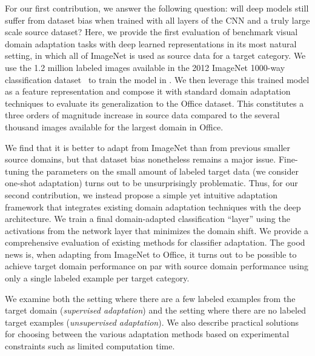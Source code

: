 For our first contribution, we answer the following question: will deep models still suffer from dataset
bias when trained with all layers of the CNN and a truly large scale source
dataset?
Here, we provide the first evaluation of benchmark visual domain adaptation
tasks with deep learned representations in its most natural setting, in which
all of ImageNet is used as source data for a target category.  We use the 1.2
million labeled images available in the 2012 ImageNet 1000-way classification
dataset~\cite{ilsvrc2012} to train the model in \cite{supervision}.  We then
leverage this trained model as a feature representation and compose it with
standard domain adaptation techniques to evaluate its generalization to the
Office dataset.  This constitutes a three orders of magnitude increase in source
data compared to the several thousand images available for the largest domain in
Office.

We find that it is better to adapt from ImageNet than from previous smaller source domains, but  that dataset bias nonetheless remains a major issue. Fine-tuning the parameters on the small amount of labeled target data (we consider one-shot adaptation) turns out to be unsurprisingly problematic. Thus, for our second contribution, we instead propose a simple yet intuitive adaptation framework that integrates existing domain adaptation techniques with the deep architecture. We train a final domain-adapted classification ``layer'' using the activations from the network layer that minimizes the domain shift. 
We provide a comprehensive evaluation of existing methods for classifier adaptation.
The good news is, when adapting from ImageNet to Office, it turns out to be possible to achieve target domain performance on par with source domain performance using only a single labeled example per target category.

We examine both the setting where there are a few labeled examples from the target domain (\emph{supervised adaptation}) and the setting where there are no labeled target examples (\emph{unsupervised adaptation}). We also describe practical solutions for choosing between the various adaptation methods based on experimental constraints such as limited computation time. 
